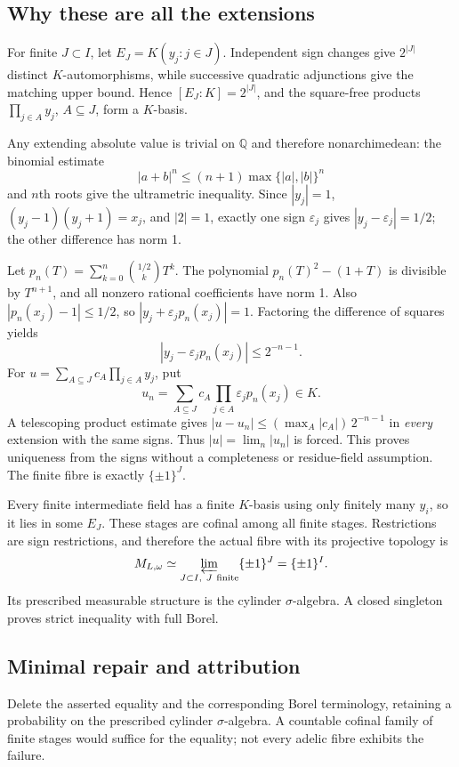 \documentclass[11pt,a4paper]{article}
\newcommand{\Q}{\mathbb Q}
\begin{document}
\subsection{Why these are all the extensions}
For finite $J\subset I$, let $E_J=K(y_j:j\in J)$. Independent sign changes give $2^{|J|}$ distinct $K$-automorphisms, while successive quadratic adjunctions give the matching upper bound. Hence $[E_J:K]=2^{|J|}$, and the square-free products $\prod_{j\in A}y_j$, $A\subseteq J$, form a $K$-basis.

Any extending absolute value is trivial on $\Q$ and therefore nonarchimedean: the binomial estimate
\[
 |a+b|^n\le(n+1)\max\{|a|,|b|\}^n
\]
and $n$th roots give the ultrametric inequality. Since $|y_j|=1$, $(y_j-1)(y_j+1)=x_j$, and $|2|=1$, exactly one sign $\varepsilon_j$ gives $|y_j-\varepsilon_j|=1/2$; the other difference has norm 1.

Let $p_n(T)=\sum_{k=0}^n\binom{1/2}{k}T^k$. The polynomial $p_n(T)^2-(1+T)$ is divisible by $T^{n+1}$, and all nonzero rational coefficients have norm 1. Also $|p_n(x_j)-1|\le1/2$, so $|y_j+\varepsilon_jp_n(x_j)|=1$. Factoring the difference of squares yields
\[
 |y_j-\varepsilon_jp_n(x_j)|\le2^{-n-1}.
\]
For $u=\sum_{A\subseteq J}c_A\prod_{j\in A}y_j$, put
\[
 u_n=\sum_{A\subseteq J}c_A\prod_{j\in A}\varepsilon_jp_n(x_j)\in K.
\]
A telescoping product estimate gives
$|u-u_n|\le(\max_A|c_A|)\,2^{-n-1}$ in \emph{every} extension with the same signs. Thus $|u|=\lim_n|u_n|$ is forced. This proves uniqueness from the signs without a completeness or residue-field assumption. The finite fibre is exactly $\{\pm1\}^J$.

Every finite intermediate field has a finite $K$-basis using only finitely many $y_i$, so it lies in some $E_J$. These stages are cofinal among all finite stages. Restrictions are sign restrictions, and therefore the actual fibre with its projective topology is
\[
 M_{L,\omega}\simeq\varprojlim_{J\subset I,\ J\ {\rm finite}}\{\pm1\}^J
 =\{\pm1\}^I.
\]
Its prescribed measurable structure is the cylinder $\sigma$-algebra. A closed singleton proves strict inequality with full Borel.

\subsection{Minimal repair and attribution}
Delete the asserted equality and the corresponding Borel terminology, retaining a probability on the prescribed cylinder $\sigma$-algebra. A countable cofinal family of finite stages would suffice for the equality; not every adelic fibre exhibits the failure.
\end{document}
